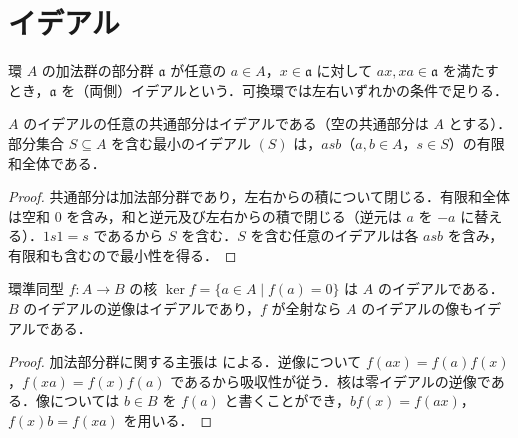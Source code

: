 \section{イデアル}
\begin{defn}[イデアル]
環 $A$ の加法群の部分群 $\mathfrak a$ が任意の $a\in A$，$x\in\mathfrak a$ に対して $ax,xa\in\mathfrak a$ を満たすとき，$\mathfrak a$ を（両側）イデアルという．可換環では左右いずれかの条件で足りる．
\end{defn}
\begin{prop}[生成イデアル]
$A$ のイデアルの任意の共通部分はイデアルである（空の共通部分は $A$ とする）．部分集合 $S\subseteq A$ を含む最小のイデアル $(S)$ は，$asb$（$a,b\in A$，$s\in S$）の有限和全体である．
\end{prop}
\begin{proof}
共通部分は加法部分群であり，左右からの積について閉じる．有限和全体は空和 $0$ を含み，和と逆元及び左右からの積で閉じる（逆元は $a$ を $-a$ に替える）．$1s1=s$ であるから $S$ を含む．$S$ を含む任意のイデアルは各 $asb$ を含み，有限和も含むので最小性を得る．
\end{proof}
\begin{prop}[環準同型の核]
環準同型 $f:A\to B$ の核 $\ker f=\{a\in A\mid f(a)=0\}$ は $A$ のイデアルである．$B$ のイデアルの逆像はイデアルであり，$f$ が全射なら $A$ のイデアルの像もイデアルである．
\end{prop}
\begin{proof}
加法部分群に関する主張は  による．逆像について $f(ax)=f(a)f(x)$，$f(xa)=f(x)f(a)$ であるから吸収性が従う．核は零イデアルの逆像である．像については $b\in B$ を $f(a)$ と書くことができ，$bf(x)=f(ax)$，$f(x)b=f(xa)$ を用いる．
\end{proof}
